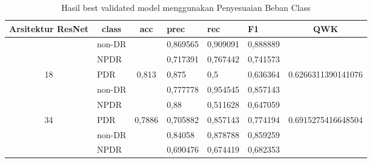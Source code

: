     \begin{table}[hbtp]
        \begin{center}
        \caption{Hasil best validated model menggunakan Penyesuaian Beban Class}
        \label{tb:HasilValClassWeight}
        \begin{tabular}{|c|l|c|l|l|l|c|}
            \hline
            \rowcolor[HTML]{C0C0C0} 
            Arsitektur ResNet     & \multicolumn{1}{c|}{\cellcolor[HTML]{C0C0C0}class} & acc                      & prec     & rec      & F1       & QWK                                  \\ \hline
                                  & non-DR                                             &                          & 0,869565 & 0,909091 & 0,888889 &                                      \\ \cline{2-2} \cline{4-6}
                                  & NPDR                                               &                          & 0,717391 & 0,767442 & 0,741573 &                                      \\ \cline{2-2} \cline{4-6}
            \multirow{-3}{*}{18}  & PDR                                                & \multirow{-3}{*}{0,813}  & 0,875    & 0,5      & 0,636364 & \multirow{-3}{*}{0.6266311390141076} \\ \hline
                                  & non-DR                                             &                          & 0,777778 & 0,954545 & 0,857143 &                                      \\ \cline{2-2} \cline{4-6}
                                  & NPDR                                               &                          & 0,88     & 0,511628 & 0,647059 &                                      \\ \cline{2-2} \cline{4-6}
            \multirow{-3}{*}{34}  & PDR                                                & \multirow{-3}{*}{0,7886} & 0,705882 & 0,857143 & 0,774194 & \multirow{-3}{*}{0.6915275416648504} \\ \hline
                                  & non-DR                                             &                          & 0,84058  & 0,878788 & 0,859259 &                                      \\ \cline{2-2} \cline{4-6}
                                  & NPDR                                               &                          & 0,690476 & 0,674419 & 0,682353 &                                      \\ \cline{2-2} \cline{4-6}

\end{tabular}
\end{center}
\end{table}
